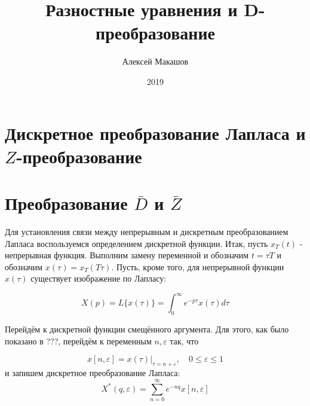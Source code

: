 \documentclass{report}
\title{Разностные уравнения и D-преобразование}
\author{Алексей Макашов}
\date{2019}
\begin{document}
    \maketitle
    \tableofcontents

    \chapter{Дискретное преобразование Лапласа и $Z$-преобразование}

    \chapter{Преобразование $\bar{D}$ и $\bar{Z}$}

    Для установления связи между непрерывным и дискретным преобразованием 
    Лапласа
    воспользуемся определением дискретной функции. Итак, пусть $x_T(t)$ - 
    непрерывная функция. Выполним замену переменной и обозначим $t=\tau T$ и
    обозначим $x(\tau)=x_T(T\tau)$. Пусть, кроме того, для непрерывной функции
    $x(\tau)$ существует изображение по Лапласу:

    \begin{equation}[laplace_direct]
        X(p)=L\{x(\tau)\} = \int_0^{\infty} e^{-p\tau}x(\tau) d\tau
    \end{equation}
     
Перейдём к дискретной функции смещённого аргумента. Для этого, как было показано в ???,
перейдём к переменным $n, \varepsilon$ так, что

\begin{equation}[discrFunc]
    x[n,\varepsilon]= x(\tau)|_{\tau=n+\varepsilon}, \quad 0\leq\varepsilon\le  1
\end{equation}
и запишем дискретное преобразование Лапласа:
\begin{equation}\label{lapDiscrete}
    X^*(q,\varepsilon)=\sum_{n=0}^{\infty} e^{-nq}x[n,\varepsilon]
\end{equation}
\end{document}
